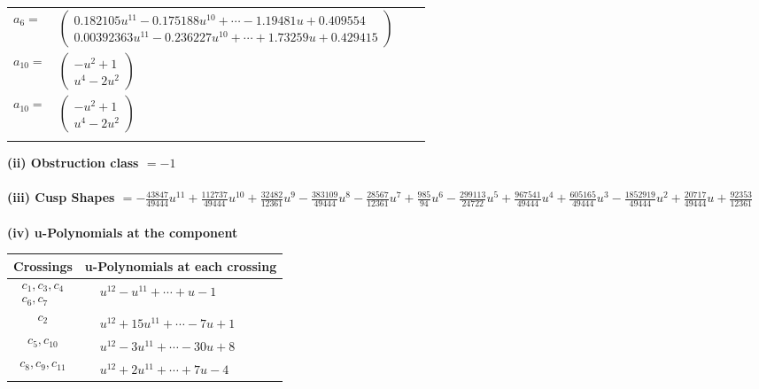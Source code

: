 \documentclass[1p]{elsarticle_modified}
\theoremstyle{definition}
\begin{document}
\begin{tabular}{m{7pt} m{180pt} m{7pt} m{180pt} }
\flushright $a_{6}=$&$\begin{pmatrix}0.182105 u^{11}-0.175188 u^{10}+\cdots-1.19481 u+0.409554\\0.00392363 u^{11}-0.236227 u^{10}+\cdots+1.73259 u+0.429415\end{pmatrix}$ \\
\flushright $a_{10}=$&$\begin{pmatrix}- u^2+1\\u^4-2 u^2\end{pmatrix}$\\ \flushright $a_{10}=$&$\begin{pmatrix}- u^2+1\\u^4-2 u^2\end{pmatrix}$\\&\end{tabular}
\flushleft \textbf{(ii) Obstruction class $= -1$}\\~\\
\flushleft \textbf{(iii) Cusp Shapes $= -\frac{43847}{49444} u^{11}+\frac{112737}{49444} u^{10}+\frac{32482}{12361} u^9-\frac{383109}{49444} u^8-\frac{28567}{12361} u^7+\frac{985}{94} u^6-\frac{299113}{24722} u^5+\frac{967541}{49444} u^4+\frac{605165}{49444} u^3-\frac{1852919}{49444} u^2+\frac{20717}{49444} u+\frac{92353}{12361}$}\\~\\
\newpage\renewcommand{\arraystretch}{1}
\flushleft \textbf{(iv) u-Polynomials at the component}\newline \\
\begin{tabular}{m{50pt}|m{274pt}}
Crossings & \hspace{64pt}u-Polynomials at each crossing \\
\hline $$\begin{aligned}c_{1},c_{3},c_{4}\\c_{6},c_{7}\end{aligned}$$&$\begin{aligned}
&u^{12}- u^{11}+\cdots+u-1
\end{aligned}$\\
\hline $$\begin{aligned}c_{2}\end{aligned}$$&$\begin{aligned}
&u^{12}+15 u^{11}+\cdots-7 u+1
\end{aligned}$\\
\hline $$\begin{aligned}c_{5},c_{10}\end{aligned}$$&$\begin{aligned}
&u^{12}-3 u^{11}+\cdots-30 u+8
\end{aligned}$\\
\hline $$\begin{aligned}c_{8},c_{9},c_{11}\end{aligned}$$&$\begin{aligned}
&u^{12}+2 u^{11}+\cdots+7 u-4
\end{aligned}$\\
\hline
\end{tabular}\\~\\
\end{document}
